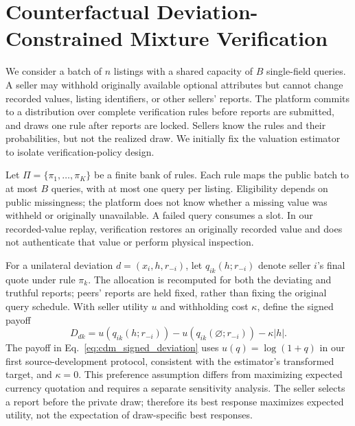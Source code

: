 \documentclass[10pt,journal]{IEEEtran}
\begin{document}
\section{Counterfactual Deviation-Constrained Mixture Verification}
\label{sec:cdm_candidate}

We consider a batch of $n$ listings with a shared capacity of $B$ single-field
queries. A seller may withhold originally available optional attributes but
cannot change recorded values, listing identifiers, or other sellers' reports.
The platform commits to a distribution over complete verification rules before
reports are submitted, and draws one rule after reports are locked. Sellers
know the rules and their probabilities, but not the realized draw. We initially
fix the valuation estimator to isolate verification-policy design.

Let $\Pi=\{\pi_1,\ldots,\pi_K\}$ be a finite bank of rules. Each rule maps the
public batch to at most $B$ queries, with at most one query per listing.
Eligibility depends on public missingness; the platform does not know whether
a missing value was withheld or originally unavailable. A failed query consumes
a slot. In our recorded-value replay, verification restores an originally
recorded value and does not authenticate that value or perform physical
inspection.

For a unilateral deviation $d=(x_i,h,r_{-i})$, let
$q_{ik}(h;r_{-i})$ denote seller $i$'s final quote under rule $\pi_k$. The
allocation is recomputed for both the deviating and truthful reports; peers'
reports are held fixed, rather than fixing the original query schedule. With
seller utility $u$ and withholding cost $\kappa$, define the signed payoff
\begin{equation}
D_{dk}=u\!\left(q_{ik}(h;r_{-i})\right)
       -u\!\left(q_{ik}(\varnothing;r_{-i})\right)-\kappa|h|.
\label{eq:cdm_signed_deviation}
\end{equation}
The payoff in Eq.~\eqref{eq:cdm_signed_deviation} uses $u(q)=\log(1+q)$ in
our first source-development protocol, consistent with
the estimator's transformed target, and $\kappa=0$. This preference assumption
differs from maximizing expected currency quotation and requires a separate
sensitivity analysis. The seller selects a report before the private draw;
therefore its best response maximizes expected utility, not the expectation of
draw-specific best responses.
\end{document}

